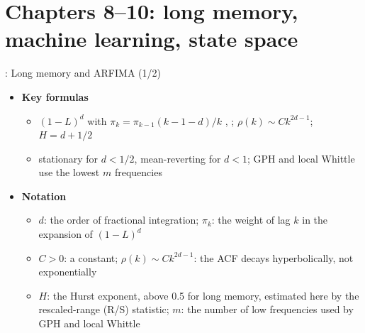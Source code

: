 \section{Chapters 8--10: long memory, machine learning, state space}

\begin{frame}{: Long memory and ARFIMA (1/2)}
\itemsize{\footnotesize}
\begin{itemize}
    \item \textbf{Key formulas}
    \begin{itemize}
        \item $(1 - L)^d$ with $\pi_k = \pi_{k-1}(k - 1 - d)/k$ , ; $\rho(k) \sim Ck^{2d-1}$; $H = d + 1/2$
        \item stationary for $d < 1/2$, mean-reverting for $d < 1$; GPH and local Whittle use the lowest $m$ frequencies
    \end{itemize}
    \item \textbf{Notation}
    \begin{itemize}
        \item $d$: the order of fractional integration; $\pi_k$: the weight of lag $k$ in the expansion of $(1 - L)^d$
        \item $C > 0$: a constant; $\rho(k) \sim Ck^{2d-1}$: the ACF decays hyperbolically, not exponentially
        \item $H$: the Hurst exponent, above 0.5 for long memory, estimated here by the rescaled-range (R/S) statistic; $m$: the number of low frequencies used by GPH and local Whittle
    \end{itemize}
\end{itemize}
\end{frame}

